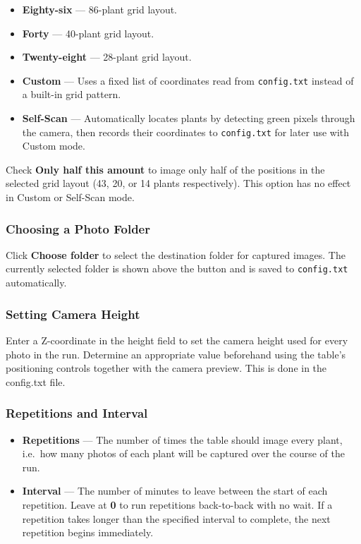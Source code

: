 \documentclass[12pt,a4paper,oneside]{report}
\begin{document}
\begin{itemize}
    \item \textbf{Eighty-six} --- 86-plant grid layout.
    \item \textbf{Forty} --- 40-plant grid layout.
    \item \textbf{Twenty-eight} --- 28-plant grid layout.
    \item \textbf{Custom} --- Uses a fixed list of coordinates read from \texttt{config.txt} instead of a built-in grid pattern.
    \item \textbf{Self-Scan} --- Automatically locates plants by detecting green pixels through the camera, then records their coordinates to \texttt{config.txt} for later use with Custom mode.
\end{itemize}

Check \textbf{Only half this amount} to image only half of the positions in the selected grid layout (43, 20, or 14 plants respectively). This option has no effect in Custom or Self-Scan mode.

\subsubsection*{Choosing a Photo Folder}

Click \textbf{Choose folder} to select the destination folder for captured images. The currently selected folder is shown above the button and is saved to \texttt{config.txt} automatically.

\subsubsection*{Setting Camera Height}

Enter a Z-coordinate in the height field to set the camera height used for every photo in the run. Determine an appropriate value beforehand using the table's positioning controls together with the camera preview. This is done in the config.txt file.

\subsubsection*{Repetitions and Interval}

\begin{itemize}
    \item \textbf{Repetitions} --- The number of times the table should image every plant, i.e.\ how many photos of each plant will be captured over the course of the run.
    \item \textbf{Interval} --- The number of minutes to leave between the start of each repetition. Leave at \textbf{0} to run repetitions back-to-back with no wait. If a repetition takes longer than the specified interval to complete, the next repetition begins immediately.
\end{itemize}
\end{document}
